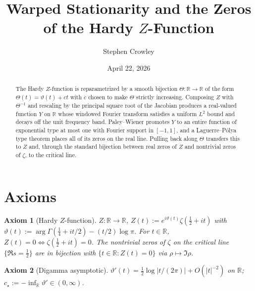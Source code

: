 \documentclass{article}
\newcommand{\assign}{:=}
\newtheorem{axiom}{Axiom}
\newcommand{\R}{\mathbb{R}}
\begin{document}
\title{Warped Stationarity and the Zeros of the Hardy $Z$-Function}

\author{Stephen Crowley}

\date{April 22, 2026}

\maketitle

\begin{abstract}
  The Hardy $Z$-function is reparametrized by a smooth bijection $\Theta : \R
  \to \R$ of the form $\Theta (t) = \vartheta (t) + ct$ with $c$ chosen to
  make $\Theta$ strictly increasing. Composing $Z$ with $\Theta^{- 1}$ and
  rescaling by the principal square root of the Jacobian produces a
  real-valued function $Y$ on $\R$ whose windowed Fourier transform satisfies
  a uniform $L^2$ bound and decays off the unit frequency band. Paley--Wiener
  promotes $Y$ to an entire function of exponential type at most one with
  Fourier support in $[- 1, 1]$, and a Laguerre--P{\'o}lya type theorem places
  all of its zeros on the real line. Pulling back along $\Theta$ transfers
  this to $Z$ and, through the standard bijection between real zeros of $Z$
  and nontrivial zeros of $\zeta$, to the critical line.
\end{abstract}

{\tableofcontents}

\section{Axioms}

\begin{axiom}
  [Hardy $Z$-function]\label{ax:Z} $Z : \R \to \R$, $Z (t) \assign e^{i
  \vartheta (t)} \zeta (\tfrac{1}{2} + it)$ with $\vartheta (t) \assign \arg
  \Gamma (\tfrac{1}{4} + it / 2) - (t / 2) \log \pi$. For $t \in \R$, $Z (t) =
  0 \Longleftrightarrow \zeta (\tfrac{1}{2} + it) = 0$. The nontrivial zeros
  of $\zeta$ on the critical line $\{\Re s = \tfrac{1}{2} \}$ are in bijection
  with $\{t \in \R : Z (t) = 0\}$ via $\rho \mapsto \Im \rho$.
\end{axiom}

\begin{axiom}
  [Digamma asymptotic]\label{ax:dig} $\vartheta' (t) = \tfrac{1}{2} \log |t /
  (2 \pi) | + O (|t|^{- 2})$ on $\R$; $c_{\star} \assign - \inf_{\R}
  \vartheta' \in (0, \infty)$.
\end{axiom}
\end{document}
